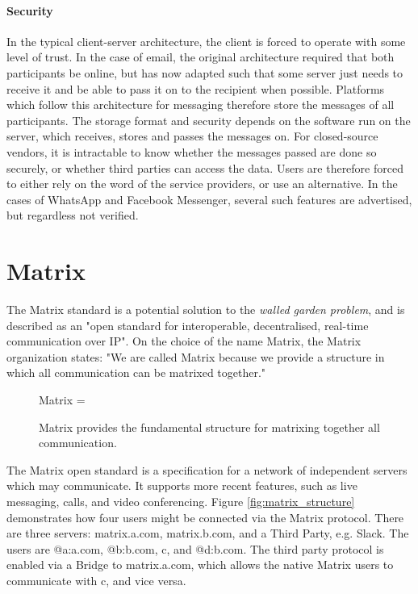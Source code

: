 \paragraph{Security}
In the typical client-server architecture, the client is forced to operate with some level of trust.
In the case of email, the original architecture required that both participants be online, but has now adapted such that some server just needs to receive it and be able to pass it on to the recipient when possible\cite{tomlinson2009first}.
Platforms which follow this architecture for messaging therefore store the messages of all participants.
The storage format and security depends on the software run on the server, which receives, stores and passes the messages on.
For closed-source vendors, it is intractable to know whether the messages passed are done so securely, or whether third parties can access the data.
Users are therefore forced to either rely on the word of the service providers, or use an alternative.
In the cases of WhatsApp and Facebook Messenger, several such features are advertised, but regardless not verified\cite{twitter_comms_protocol_comparison}.

\section{Matrix}
The Matrix standard is a potential solution to the \textit{walled garden problem}, and is described as an "open standard for interoperable, decentralised, real-time communication over IP"\cite{matrix_org}.
On the choice of the name Matrix, the Matrix organization states: "We are called Matrix because we provide a structure in which all communication can be matrixed together."\cite{matrix_org_faq}

\begin{figure}[h]
    \centering
    Matrix = 
    \caption{Matrix provides the fundamental structure for matrixing together all communication.}
    \label{}
\end{figure}

The Matrix open standard\cite{matrix_org_spec} is a specification for a network of independent servers which may communicate.
It supports more recent features, such as live messaging, calls, and video conferencing.
Figure \ref{fig:matrix_structure} demonstrates how four users might be connected via the Matrix protocol.
There are three servers: matrix.a.com, matrix.b.com, and a Third Party, e.g. Slack.
The users are @a:a.com, @b:b.com, c, and @d:b.com.
The third party protocol is enabled via a Bridge to matrix.a.com, which allows the native Matrix users to communicate with c, and vice versa.

